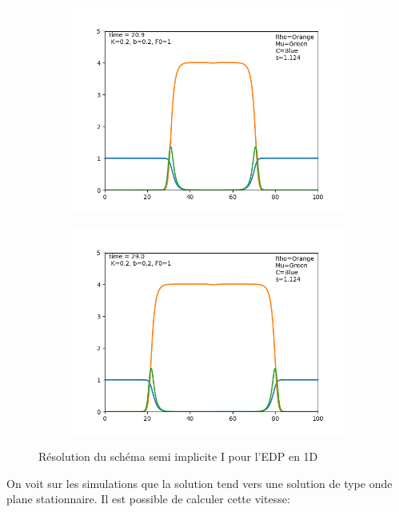 \begin{figure}[hbt!]
\begin{subfigure}[b]{0.45\textwidth}
\end{subfigure}
\begin{subfigure}[b]{0.45\textwidth}
\includegraphics[width=\textwidth]{Images/edp_1d_2.png}
\end{subfigure}
\begin{subfigure}[b]{0.45\textwidth}
\includegraphics[width=\textwidth]{Images/edp_1d_3.png}
\end{subfigure}
\caption{Résolution du schéma semi implicite I pour l'EDP en 1D} 
\end{figure}
On voit sur les simulations que la solution tend vers une solution de type onde plane stationnaire. Il est possible de calculer cette vitesse: 

